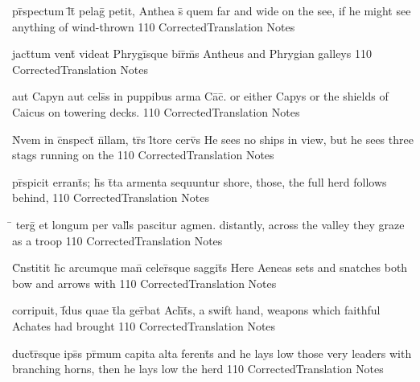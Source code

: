 \documentclass[]{book}
\begin{document}
\latline
  {pr\={}spectum l\={}t\={} pelag\={} petit, Anthea s\={\macron {\i}} quem}
  { far and wide on the see, if he might see anything of wind-thrown }
  {110}
  { CorrectedTranslation }
  { Notes }


\latline
  {jact\={}tum vent\={} videat Phrygi\={}sque bir\={}m\={\macron {\i}}s}
  { Antheus and Phrygian galleys }
  {110}
  { CorrectedTranslation }
  { Notes }


\latline
  {aut Capyn aut cels\={\macron {\i}}s in puppibus arma Ca\={\macron {\i}}c\={\macron {\i}}.}
  { or either Capys or the shields of Caicus on towering decks. }
  {110}
  { CorrectedTranslation }
  { Notes }



\latline
  {N\={}vem in c\={}nspect\={} n\={}llam, tr\={\macron {\i}}s l\={\macron {\i}}tore cerv\={}s}
  { He sees no ships in view, but he sees three stags running on the  }
  {110}
  { CorrectedTranslation }
  { Notes }


\latline
  {pr\={}spicit errant\={\macron {\i}}s; h\={}s t\={}ta armenta sequuntur}
  { shore, those, the full herd follows behind, }
  {110}
  { CorrectedTranslation }
  { Notes }


\latline
  {\={} terg\={} et longum per vall\={\macron {\i}}s pascitur agmen.}
  { distantly, across the valley they graze as a troop }
  {110}
  { CorrectedTranslation }
  { Notes }



\latline
  {C\={}nstitit h\={\macron {\i}}c arcumque man\={} celer\={\macron {\i}}sque saggit\={}s}
  { Here Aeneas sets and snatches both bow and arrows with }
  {110}
  { CorrectedTranslation }
  { Notes }


\latline
  {corripuit, f\={\macron {\i}}dus quae t\={}la ger\={}bat Ach\={}t\={}s,}
  { a swift hand, weapons which faithful Achates had brought  }
  {110}
  { CorrectedTranslation }
  { Notes }


\latline
  {duct\={}r\={}sque ips\={}s pr\={\macron {\i}}mum capita alta ferent\={\macron {\i}}s}
  { and he lays low those very leaders with branching horns, then he lays low the herd  }
  {110}
  { CorrectedTranslation }
  { Notes }
\end{document}
